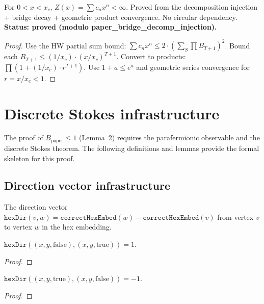 \begin{theorem}\label{thm:hw_summable}
  For $0 < x < x_c$, $Z(x) = \sum c_n x^n < \infty$.
  Proved from the decomposition injection + bridge decay +
  geometric product convergence. No circular dependency.
  \textbf{Status: proved (modulo paper\_bridge\_decomp\_injection).}
\end{theorem}
\begin{proof}
  Use the HW partial sum bound: $\sum c_n x^n \leq 2 \cdot (\sum_S \prod B_{T+1})^2$.
  Bound each $B_{T+1} \leq (1/x_c) \cdot (x/x_c)^{T+1}$.
  Convert to products: $\prod (1 + (1/x_c) \cdot r^{T+1})$.
  Use $1+a \leq e^a$ and geometric series convergence for $r = x/x_c < 1$.
\end{proof}

\section{Discrete Stokes infrastructure}

The proof of $B_{\text{paper}} \leq 1$ (Lemma~2) requires the parafermionic
observable and the discrete Stokes theorem.  The following definitions
and lemmas provide the formal skeleton for this proof.

\subsection{Direction vector infrastructure}

\begin{definition}\label{def:hex_dir}
\leanok
{}
  The direction vector $\texttt{hexDir}(v, w) = \texttt{correctHexEmbed}(w) - \texttt{correctHexEmbed}(v)$
  from vertex $v$ to vertex $w$ in the hex embedding.
\end{definition}

\begin{lemma}\label{lem:hex_dir_false}
\leanok
{}
  $\texttt{hexDir}((x,y,\text{false}), (x,y,\text{true})) = 1$.
\end{lemma}
\begin{proof}
\leanok
\end{proof}

\begin{lemma}\label{lem:hex_dir_true}
\leanok
{}
  $\texttt{hexDir}((x,y,\text{true}), (x,y,\text{false})) = -1$.
\end{lemma}
\begin{proof}
\leanok
\end{proof}

